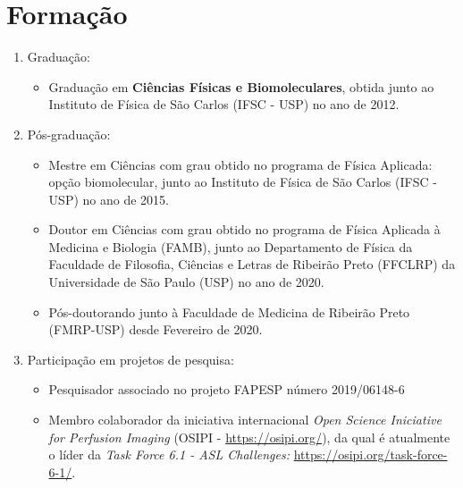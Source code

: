\documentclass[a4paper,oneside,10pt]{article}
\begin{document}
\section{Formação}
\large{
\begin{enumerate}
        \item Graduação:
        \begin{itemize}
                \item Graduação em \textbf{Ciências Físicas e Biomoleculares}, obtida junto ao Instituto de Física de São Carlos (IFSC - USP) no ano de 2012. \mbox{} \\
        \end{itemize}

        \item Pós-graduação:
        \begin{itemize}
                \item Mestre em Ciências com grau obtido no programa de Física Aplicada: opção biomolecular, junto ao Instituto de Física de São Carlos (IFSC - USP) no ano de 2015. \mbox{} \\
                \item Doutor em Ciências com grau obtido no programa de Física Aplicada à Medicina e Biologia (FAMB), junto ao Departamento de Física da Faculdade de Filosofia, Ciências e Letras de Ribeirão Preto (FFCLRP) da Universidade de São Paulo (USP) no ano de 2020. \mbox{} \\
                \item Pós-doutorando junto à Faculdade de Medicina de Ribeirão Preto (FMRP-USP) desde Fevereiro de 2020. \mbox{}
        \end{itemize}

        \item Participação em projetos de pesquisa:
        \begin{itemize}
                \item Pesquisador associado no projeto FAPESP número 2019/06148-6 \mbox{} \\
                \item Membro colaborador da iniciativa internacional \textit{Open Science Iniciative for Perfusion Imaging} (OSIPI - \url{https://osipi.org/}), da qual é atualmente o líder 
        da \textit{Task Force 6.1 - ASL Challenges:} \url{https://osipi.org/task-force-6-1/}.
        \end{itemize}


\end{enumerate}}
\end{document}
